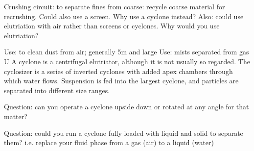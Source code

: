 Crushing circuit: to separate fines from coarse: recycle coarse material for recrushing. Could also use a screen. Why use a cyclone instead?
Also: could use elutriation with air rather than screens or cyclones. Why would you use elutriation?

Use: to clean dust from air; generally 5\mu m and large
Use: mists separated from gas
U
A cyclone is a centrifugal elutriator, although it is not usually so regarded. The cyclosizer is a series of inverted cyclones with added apex chambers through which water flows. Suspension is fed into the largest cyclone, and particles are separated into different size ranges.

Question: can you operate a cyclone upside down or rotated at any angle for that matter?

Question: could you run a cyclone fully loaded with liquid and solid to separate them? i.e. replace your fluid phase from a gas (air) to a liquid (water)

